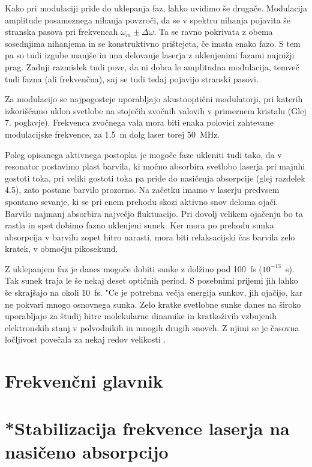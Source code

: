 Kako pri modulaciji pride do uklepanja faz, lahko uvidimo še drugače.
Modulacija amplitude posameznega nihanja povzroči, da se v spektru nihanja
pojavita še stranska pasova pri frekvencah $\omega_m \pm \Delta\omega$. Ta
se ravno pokrivata z obema sosednjima nihanjema in se konstruktivno
prištejeta, če imata enako fazo. S tem pa so tudi izgube manjše in ima
delovanje laserja z uklenjenimi fazami najnižji prag. Zadnji razmislek
tudi pove, da ni dobra le amplitudna modulacija, temveč tudi fazna (ali
frekvenčna), saj se tudi tedaj pojavijo stranski pasovi.

Za modulacijo se najpogosteje uporabljajo akustooptični modulatorji, pri
katerih izkoriščamo uklon svetlobe na stoječih zvočnih valovih v
primernem kristalu (Glej 7. poglavje). Frekvenca zvočnega vala mora biti
enaka polovici zahtevane modulacijske frekvence, za 1,5~m dolg laser torej
50~MHz.

Poleg opisanega aktivnega postopka je mogoče faze ukleniti tudi tako, da v
resonator postavimo plast barvila, ki močno absorbira svetlobo laserja pri
majnhi gostoti toka, pri veliki gostoti toka pa pride do nasičenja
absorpcije (glej razdelek 4.5), zato postane barvilo prozorno. Na začetku
imamo v laserju predvsem spontano sevanje, ki se pri enem prehodu skozi
aktivno snov deloma ojači. Barvilo najmanj absorbira največjo fluktuacijo.
Pri dovolj velikem ojačenju bo ta rastla in spet dobimo fazno uklenjeni
sunek. Ker mora po prehodu sunka absorpcija v barvilu zopet hitro narasti,
mora biti relaksacijski čas barvila zelo kratek, v območju pikosekund.

Z uklepanjem faz je danes mogoče dobiti sunke z dolžino pod 100~fs ($%
10^{-13}$~s). Tak sunek traja le še nekaj deset optičnih period. S
posebnimi prijemi jih lahko še skrajšajo na okoli 10~fs. "Ce je potrebna
večja energija sunkov, jih ojačijo, kar ne pokvari mnogo osnovnega sunka.
Zelo kratke svetlobne sunke danes na široko uporabljajo za študij hitre
molekularne dinamike in kratkoživih vzbujenih elektronskih stanj v
polvodnikih in mnogih drugih snoveh. Z njimi se je časovna ločljivost
povečala za nekaj redov velikosti \cite{pikosekunde}.

\section{Frekvenčni glavnik}

\section{*Stabilizacija frekvence laserja na na\-sičeno absorpcijo}
\label{chap:stabilizacija}


